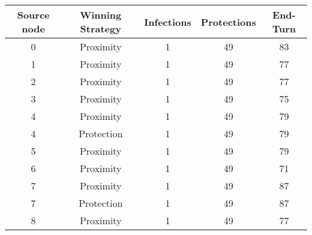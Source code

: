 \documentclass[results.tex]{subfiles}
\begin{document}
    \begin{center}
        \begin{tabular}{| c || c | c | c | c |}
            \hline
            {\bfseries Source node} & {\bfseries Winning Strategy} & {\bfseries Infections} & {\bfseries Protections}
            & {\bfseries End-Turn}
            \\  %
            \hline\hline
            0                       & Proximity                    & 1                      & 49                      & 83                   \\
            \hline
            1                       & Proximity                    & 1                      & 49                      & 77                   \\
            \hline
            2                       & Proximity                    & 1                      & 49                      & 77                   \\
            \hline
            3                       & Proximity                    & 1                      & 49                      & 75                   \\
            \hline
            4                       & Proximity                    & 1                      & 49                      & 79                   \\
            \hline
            4                       & Protection                   & 1                      & 49                      & 79                   \\
            \hline
            5                       & Proximity                    & 1                      & 49                      & 79                   \\
            \hline
            6                       & Proximity                    & 1                      & 49                      & 71                   \\
            \hline
            7                       & Proximity                    & 1                      & 49                      & 87                   \\
            \hline
            7                       & Protection                   & 1                      & 49                      & 87                   \\
            \hline
            8                       & Proximity                    & 1                      & 49                      & 77                   \\

\end{tabular}
\end{center}
\end{document}
